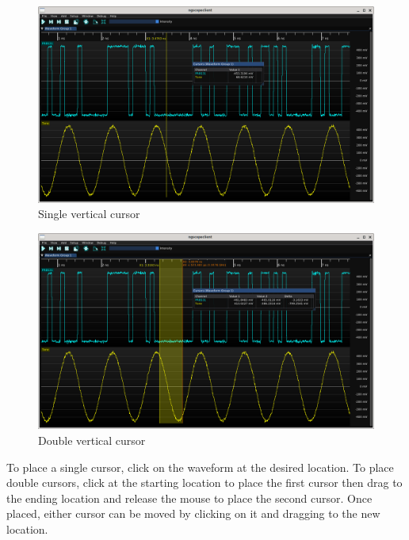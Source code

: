 \begin{figure}[H]
\centering
\includegraphics[width=13cm]{ng-images/vertical-cursor.png}
\caption{Single vertical cursor}
\label{vertical-cursor}
\end{figure}

\begin{figure}[H]
\centering
\includegraphics[width=13cm]{ng-images/vertical-cursor-x2.png}
\caption{Double vertical cursor}
\label{vertical-cursor-x2}
\end{figure}

To place a single cursor, click on the waveform at the desired location. To place double cursors, click at the starting
location to place the first cursor then drag to the ending location and release the mouse to place the second cursor.
Once placed, either cursor can be moved by clicking on it and dragging to the new location.


